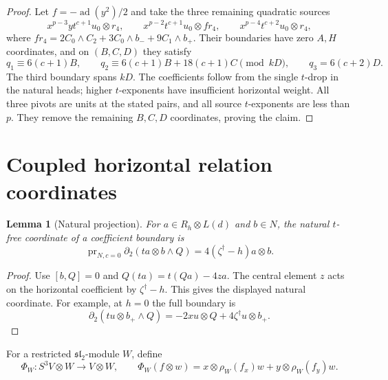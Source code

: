 \documentclass[11pt]{article}
\theoremstyle{plain}
\newtheorem{lemma}[lemma]{Lemma}
\theoremstyle{definition}
\theoremstyle{remark}
\numberwithin{equation}{section}
\newcommand{\kk}{k}
\newcommand{\slie}{\mathfrak{sl}_2}
\begin{document}
\begin{proof}
Let $f=-\operatorname{ad}(y^2)/2$ and take the three remaining quadratic sources
\[
 x^{p-3}yt^{c+1}u_0\otimes r_4,\qquad
 x^{p-2}t^{c+1}u_0\otimes fr_4,\qquad
 x^{p-4}t^{c+2}u_0\otimes r_4,
\]
where $fr_4=2C_0\wedge C_2+3C_0\wedge b_-+9C_1\wedge b_+$.
Their boundaries have zero $A,H$ coordinates, and on $(B,C,D)$ they satisfy
\[
 q_1\equiv6(c+1)B,\qquad
 q_2\equiv6(c+1)B+18(c+1)C\pmod{\kk D},\qquad
 q_3=6(c+2)D.
\]
The third boundary spans $\kk D$.
The coefficients follow from the single $t$-drop in the natural heads;
higher $t$-exponents have insufficient horizontal weight.
All three pivots are units at the stated pairs, and all source
$t$-exponents are less than $p$. They remove the remaining $B,C,D$
coordinates, proving the claim.
\end{proof}

\section{Coupled horizontal relation coordinates}\label{sec:tfree-horizontal}

\begin{lemma}[Natural projection]\label{lem:c0-central}
For $a\in R_h\otimes L(d)$ and $b\in N$, the natural $t$-free
coordinate of a coefficient boundary is
\begin{equation}\label{eq:c0-central}
 \operatorname{pr}_{N,c=0}\partial_2(ta\otimes b\wedge Q)
       =4(\zeta^\dagger-h)a\otimes b.
\end{equation}
\end{lemma}
\begin{proof}
Use $[b,Q]=0$ and $Q(ta)=t(Qa)-4za$.
The central element $z$ acts on the horizontal coefficient by
$\zeta^\dagger-h$. This gives the displayed natural coordinate.
For example, at $h=0$ the full boundary is
\[
 \partial_2(tu\otimes b_+\wedge Q)
       =-2xu\otimes Q+4\zeta^\dagger u\otimes b_+.
\]
\end{proof}

For a restricted $\slie$-module $W$, define
\begin{equation}\label{eq:PhiW}
 \Phi_W:S^3V\otimes W\longrightarrow V\otimes W,\qquad
 \Phi_W(f\otimes w)=x\otimes\rho_W(f_x)w+y\otimes\rho_W(f_y)w.
\end{equation}
\end{document}
